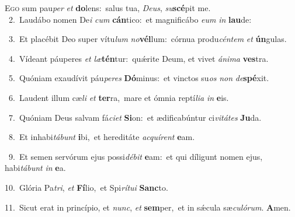 \lettrine{\initial\textcolor{\initialcolor}{E}}{go} sum pau\textit{per} \textit{et} \textbf{do}\-lens:~\star salus tua, \textit{De}\-\textit{us}, \textit{su}\-\textbf{scé}pit me.\\
{\numbfont\textcolor{\numbcolor}{~2.}}~Laudábo nomen De\textit{i} \textit{cum} \textbf{cán}\-tico:~\star et magnificábo \textit{e}\-\textit{um} \textit{in} \textbf{lau}\-de:\par
{\numbfont\textcolor{\numbcolor}{~3.}}~Et placébit Deo super vítu\textit{lum} \textit{no}\-\textbf{vél}lum:~\star córnua produ\-\textit{cén}\-\textit{tem} \textit{et} \textbf{ún}\-gulas.\par
{\numbfont\textcolor{\numbcolor}{~4.}}~Vídeant páuperes \textit{et} \textit{læ}\-\textbf{tén}tur:~\star quǽrite Deum, et vivet \textit{á}\-\textit{ni}\textit{ma} \textbf{ves}\-tra.\par
{\numbfont\textcolor{\numbcolor}{~5.}}~Quóniam exaudívit páu\-\textit{pe}\-\textit{res} \textbf{Dó}\-minus:~\star et vinctos su\textit{os} \textit{non} \textit{de}\-\textbf{spé}xit.\par
{\numbfont\textcolor{\numbcolor}{~6.}}~Laudent illum cæ\textit{li} \textit{et} \textbf{ter}\-ra,~\star mare et ómnia reptí\-\textit{li}\-\textit{a} \textit{in} \textbf{e}\-is.\par
{\numbfont\textcolor{\numbcolor}{~7.}}~Quóniam Deus salvam fá\-\textit{ci}\-\textit{et} \textbf{Si}\-on:~\star et ædificabúntur ci\-\textit{vi}\-\textit{tá}\textit{tes} \textbf{Ju}\-da.\par
{\numbfont\textcolor{\numbcolor}{~8.}}~Et inhabi\-\textit{tá}\-\textit{bunt} \textbf{i}\-bi,~\star et hereditáte \textit{ac}\-\textit{quí}\textit{rent} \textbf{e}\-am.\par
{\numbfont\textcolor{\numbcolor}{~9.}}~Et semen servórum ejus possi\-\textit{dé}\-\textit{bit} \textbf{e}\-am:~\star et qui díligunt nomen ejus, habi\-\textit{tá}\-\textit{bunt} \textit{in} \textbf{e}\-a.\par
{\numbfont\textcolor{\numbcolor}{10.}}~Glória Pa\-\textit{tri}\-, \textit{et} \textbf{Fí}\-lio,~\star et Spi\-\textit{rí}\-\textit{tu}\textit{i} \textbf{Sanc}\-to.\par
{\numbfont\textcolor{\numbcolor}{11.}}~Sicut erat in princípio, et \textit{nunc}\-, \textit{et} \textbf{sem}\-per,~\star et in sǽcula sæ\-\textit{cu}\-\textit{ló}\textit{rum}. \textbf{A}\-men.\par
